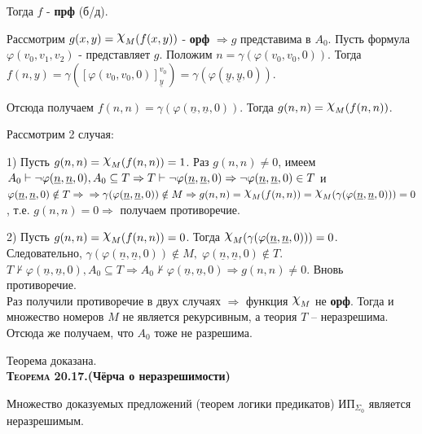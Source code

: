 \documentclass[18pt, a4paper]{extarticle}
\newcommand{\teor}[1]{\textbf{\textsc{Теорема #1}}}
\newcommand{\vp}{\varphi}
\newcommand{\vd}{\vdash}
\begin{document}
Тогда $f$ - \textbf{прф} (б/д).

Рассмотрим $g(x,y)=\raisebox{.5ex}{\scalebox{1.2}{$\chi$}}_M(f(x,y))$ - \textbf{орф} $\Rightarrow g$ представима в $A_0$. Пусть формула $\vp(v_0,v_1,v_2)$ - представляет $g$. Положим $n=\gamma(\vp(v_0,v_0,0))$. Тогда $f(n,y)=\gamma([\vp(v_0,v_0,0)]_{\underline{y}}^{v_0})=\gamma(\vp(\underline{y},\underline{y},0))$. 

Отсюда получаем $f(n,n)=\gamma(\vp(\underline{n},\underline{n},0))$. Тогда $g(n,n)=\raisebox{.5ex}{\scalebox{1.2}{$\chi$}}_M(f(n,n))$. 

Рассмотрим 2 случая:

1) Пусть $g(n,n)=\raisebox{.5ex}{\scalebox{1.2}{$\chi$}}_M(f(n,n))=1$. Раз $g(n,n)\neq0$, имеем $A_0\vd\lnot\vp(\underline{n},\underline{n},0),\newline A_0\subseteq T\Rightarrow T\vd\lnot\vp(\underline{n},\underline{n},0)\Rightarrow\lnot\vp(\underline{n},\underline{n},0)\in T$ и $\vp(\underline{n},\underline{n},0)\notin T\Rightarrow\newline\Rightarrow\gamma(\vp(\underline{n},\underline{n},0))\notin M\Rightarrow g(n,n)=\raisebox{.5ex}{\scalebox{1.2}{$\chi$}}_M(f(n,n))=\raisebox{.5ex}{\scalebox{1.2}{$\chi$}}_M(\gamma(\vp(\underline{n},\underline{n},0)))=0$, т.е. $g(n,n)=0\Rightarrow$ получаем противоречие.

2) Пусть $g(n,n)=\raisebox{.5ex}{\scalebox{1.2}{$\chi$}}_M(f(n,n))=0$. Тогда $\raisebox{.5ex}{\scalebox{1.2}{$\chi$}}_M(\gamma(\vp(\underline{n},\underline{n},0)))=0$. Следовательно, $\gamma(\vp(\underline{n},\underline{n},0))\notin M,\;\vp(\underline{n},\underline{n},0)\notin T$.\\
$T\nvdash\vp(\underline{n},\underline{n},0),A_0\subseteq T\Rightarrow A_0\nvdash\vp(\underline{n},\underline{n},0)\Rightarrow g(n,n)\neq 0$. Вновь противоречие.\\

Раз получили противоречие в двух случаях $\Rightarrow$ функция $\raisebox{.5ex}{\scalebox{1.2}{$\chi$}}_M$ не \textbf{орф}. Тогда и множество номеров $M$ не является рекурсивным, а теория $T$ – неразрешима. Отсюда же получаем, что $A_0$ тоже не разрешима.

Теорема доказана.\\

\teor{20.17.}\textbf{(Чёрча о неразрешимости)}

Множество доказуемых предложений (теорем логики предикатов) $\text{ИП}_{\Sigma_0}$ является неразрешимым.
\end{document}
